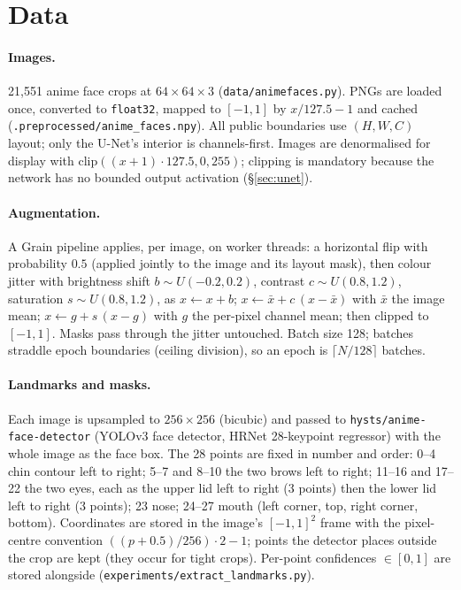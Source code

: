 \documentclass[11pt]{article}
\begin{document}
\section{Data}\label{sec:data}

\paragraph{Images.} 21{,}551 anime face crops at $64\times64\times3$
(\texttt{data/animefaces.py}). PNGs are loaded once, converted to
\texttt{float32}, mapped to $[-1,1]$ by $x/127.5-1$ and cached
(\texttt{.preprocessed/anime\_faces.npy}). All public boundaries use $(H,W,C)$ layout;
only the U-Net's interior is channels-first. Images are denormalised for display with
$\mathrm{clip}((x+1)\cdot127.5, 0, 255)$; clipping is mandatory because the network has
no bounded output activation (\S\ref{sec:unet}).

\paragraph{Augmentation.} A Grain pipeline applies, per image, on worker threads:
a horizontal flip with probability $0.5$ (applied jointly to the image and its layout
mask), then colour jitter with brightness shift $b\sim U(-0.2,0.2)$, contrast
$c\sim U(0.8,1.2)$, saturation $s\sim U(0.8,1.2)$, as
$x \leftarrow x + b$; $x \leftarrow \bar{x} + c\,(x-\bar{x})$ with $\bar{x}$ the image
mean; $x \leftarrow g + s\,(x - g)$ with $g$ the per-pixel channel mean; then clipped to
$[-1,1]$. Masks pass through the jitter untouched. Batch size 128; batches straddle
epoch boundaries (ceiling division), so an epoch is $\lceil N/128\rceil$ batches.

\paragraph{Landmarks and masks.}\label{sec:masks} Each image is upsampled to $256\times256$
(bicubic) and passed to \texttt{hysts/anime-face-detector} (YOLOv3 face detector,
HRNet 28-keypoint regressor) with the whole image as the face box. The 28 points are
fixed in number and order: 0--4 chin contour left to right; 5--7 and 8--10 the two
brows left to right; 11--16 and 17--22 the two eyes, each as the upper lid left to
right (3 points) then the lower lid left to right (3 points); 23 nose; 24--27 mouth
(left corner, top, right corner, bottom). Coordinates are stored in the image's
$[-1,1]^2$ frame with the pixel-centre convention $((p+0.5)/256)\cdot 2-1$; points the
detector places outside the crop are kept (they occur for tight crops). Per-point
confidences $\in[0,1]$ are stored alongside
(\texttt{experiments/extract\_landmarks.py}).
\end{document}
